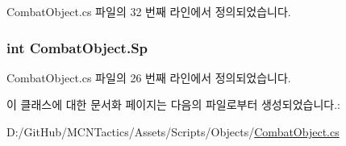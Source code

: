 Combat\+Object.\+cs 파일의 32 번째 라인에서 정의되었습니다.

\subsubsection[{\texorpdfstring{Sp}{Sp}}]{\setlength{\rightskip}{0pt plus 5cm}int Combat\+Object.\+Sp\hspace{0.3cm}{\ttfamily [get]}}\hypertarget{class_combat_object_a042786e7e585cb8c00a3a85d3e89f861}{}\label{class_combat_object_a042786e7e585cb8c00a3a85d3e89f861}


Combat\+Object.\+cs 파일의 26 번째 라인에서 정의되었습니다.



이 클래스에 대한 문서화 페이지는 다음의 파일로부터 생성되었습니다.\+:\begin{DoxyCompactItemize}
\item 
D\+:/\+Git\+Hub/\+M\+C\+N\+Tactics/\+Assets/\+Scripts/\+Objects/\hyperlink{_combat_object_8cs}{Combat\+Object.\+cs}\end{DoxyCompactItemize}
